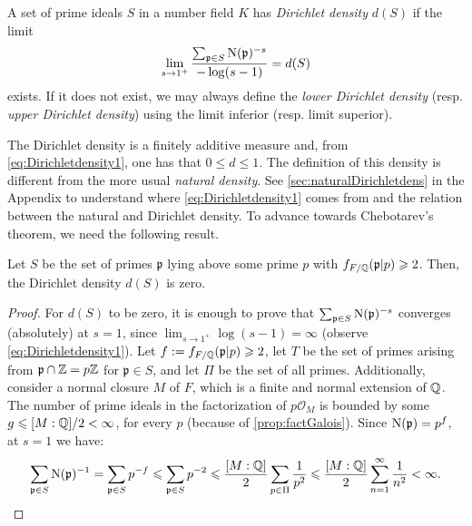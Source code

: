 \documentclass[../main.tex]{subfiles}
\begin{document}
	A set of prime ideals $S$ in a number field $K$ has \emph{Dirichlet density} $d(S)$ if the limit
	\begin{equation}\label{eq:Dirichletdensity1}
		\lim_{s\rightarrow1^+}\frac{\sum_{\mathfrak{p}\in S}\operatorname{N}(\mathfrak{p})^{-s}}{-\log(s-1)}=d(S)
	\end{equation}
	exists. If it does not exist, we may always define the \emph{lower Dirichlet density} (resp. \emph{upper Dirichlet density}) using the limit inferior (resp. limit superior).

The Dirichlet density is a finitely additive measure and, from \cref{eq:Dirichletdensity1}, one has that $0\leqslant d\leqslant 1$. The definition of this density is different from the more usual \emph{natural density}. See \cref{sec:naturalDirichletdens} in the Appendix to understand where \cref{eq:Dirichletdensity1} comes from and the relation between the natural and Dirichlet density. To advance towards Chebotarev's theorem, we need the following result.
\begin{lemma}
	Let $S$ be the set of primes $\mathfrak{p}$ lying above some prime $p$ with $f_{F/\mathbb{Q}}(\mathfrak{p}|p)\geqslant 2$. Then, the Dirichlet density $d(S)$ is zero.
\end{lemma}
\begin{proof}
	 For $d(S)$ to be zero, it is enough to prove that $\sum_{\mathfrak{p}\in S}\operatorname{N}(\mathfrak{p})^{-s}$ converges (absolutely) at $s=1$, since $\lim_{s\rightarrow1^+}\log(s-1)=\infty$ (observe \cref{eq:Dirichletdensity1}). Let $f:=f_{F/\mathbb{Q}}(\mathfrak{p}|p)\geqslant 2$, let $T$ be the set of primes arising from $\mathfrak{p}\cap \mathbb{Z}=p\mathbb{Z}$ for $\mathfrak{p}\in S$, and let $\Pi$ be the set of all primes. Additionally, consider a normal closure $M$ of $F$, which is a finite and normal extension of $\mathbb{Q}$. The number of prime ideals in the factorization of $p\mathcal{O}_M$ is bounded by some $g\leqslant [M:\mathbb{Q}]/2<\infty$, for every $p$ (because of \cref{prop:factGalois}). Since $\operatorname{N}(\mathfrak{p})=p^f$, at $s=1$ we have:
	\begin{equation*}
		\sum_{\mathfrak{p}\in S}\operatorname{N}(\mathfrak{p})^{-1}=\sum_{\mathfrak{p}\in S}p^{-f}\leqslant \sum_{\mathfrak{p}\in S}p^{-2}\leqslant \frac{[M:\mathbb{Q}]}{2}\sum_{p\in \Pi}\frac{1}{p^2}\leqslant \frac{[M:\mathbb{Q}]}{2}\sum_{n=1}^{\infty}\frac{1}{n^2}<\infty.
	\end{equation*}
\end{proof}
\end{document}
